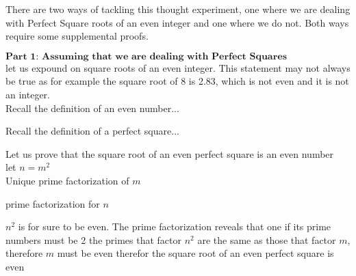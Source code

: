 \documentclass[12pt, a4paper]{article}
\begin{document}
\vspace{0.5cm}
There are two ways of tackling this thought experiment, one where
we are dealing with Perfect Square roots of an even integer and one where
we do not. Both ways require some supplemental proofs.

\vspace{1cm}
$\textbf{Part 1: Assuming that we are dealing with Perfect Squares}$
\vspace{0.5cm}
\\let us expound on square roots of an even integer. This statement may not always be true as for example the square root of 8 is 2.83, which is not even and it is not an integer.
\vspace{0.5cm}
\\
Recall the definition of an even number...

\centering{\fontsize{17}{18}\selectfont

\[
  \forall n \in \mathbb{Z} \space\space\space\text{is EVEN}\iff \exists k \in \mathbb{Z}, n = 2k
\]
}

\raggedright
\vspace{0.5cm}
Recall the definition of a perfect square...


\raggedright
\vspace{0.5cm}
Let us prove that the square root of an even perfect square
is an even number\\

\vspace{0.5cm}
let $n = m^{2}$\\
Unique prime factorization of $m$

\centering{\fontsize{17}{18}\selectfont

\[
  m = \prod p_i^{n_i}
\]
}

\raggedright
\vspace{0.5cm}
prime factorization for $n$

\centering{\fontsize{17}{18}\selectfont

\[
  n = \prod p_i^{2n_i}
\]
}


\raggedright
\vspace{0.5cm}

$n^{2}$ is for sure to be even. The prime factorization reveals that one if its prime numbers must be 2
the primes that factor $n^{2}$ are the same as those that factor $m$, therefore $m$ must be even
therefor the square root of an even perfect square is even
\end{document}
